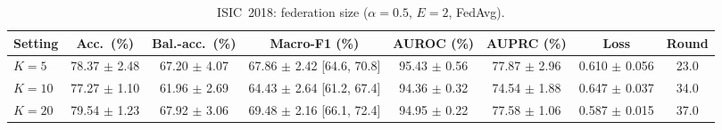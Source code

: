 \begin{table}[!t]
\caption{ISIC~2018: federation size ($\alpha{=}0.5$, $E{=}2$, FedAvg).}
\label{tab:18-nclients}
\centering
\footnotesize
\begin{tabular}{lccccccc}
\toprule
Setting & Acc.\ (\%) & Bal.-acc.\ (\%) & Macro-F1 (\%) & AUROC (\%) & AUPRC (\%) & Loss & Round \\
\midrule
$K=5$ & 78.37 $\pm$ 2.48 & 67.20 $\pm$ 4.07 & 67.86 $\pm$ 2.42 [64.6, 70.8] & 95.43 $\pm$ 0.56 & 77.87 $\pm$ 2.96 & 0.610 $\pm$ 0.056 & 23.0 \\
$K=10$ & 77.27 $\pm$ 1.10 & 61.96 $\pm$ 2.69 & 64.43 $\pm$ 2.64 [61.2, 67.4] & 94.36 $\pm$ 0.32 & 74.54 $\pm$ 1.88 & 0.647 $\pm$ 0.037 & 34.0 \\
$K=20$ & 79.54 $\pm$ 1.23 & 67.92 $\pm$ 3.06 & 69.48 $\pm$ 2.16 [66.1, 72.4] & 94.95 $\pm$ 0.22 & 77.58 $\pm$ 1.06 & 0.587 $\pm$ 0.015 & 37.0 \\
\bottomrule
\end{tabular}
\end{table}
